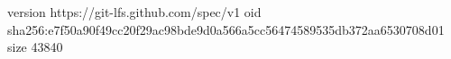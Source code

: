 version https://git-lfs.github.com/spec/v1
oid sha256:e7f50a90f49cc20f29ac98bde9d0a566a5cc56474589535db372aa6530708d01
size 43840
